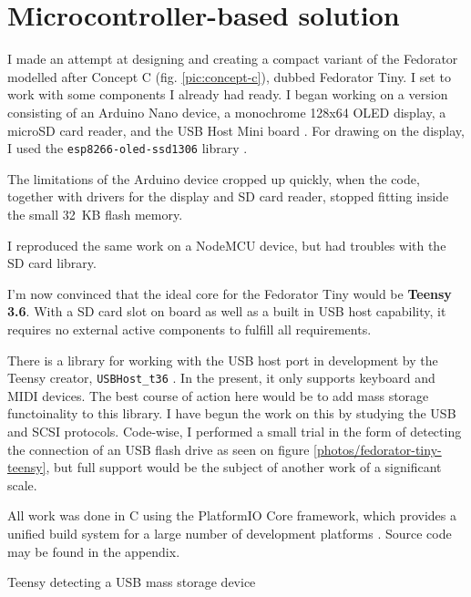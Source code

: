 \chapter{Microcontroller-based solution}
    
    I made an attempt at designing and creating a compact variant of the Fedorator modelled after Concept C  (fig. \ref{pic:concept-c}), dubbed Fedorator Tiny.  I set to work with some components I already had ready.  I began working on a version consisting of an Arduino Nano device, a monochrome 128x64 OLED display, a microSD card reader, and the USB Host Mini board \cite{usb-host-shield}.  For drawing on the display, I used the \texttt{esp8266-oled-ssd1306} library \cite{esp8266-oled-ssd1306}.
    
    The limitations of the Arduino device cropped up quickly, when the code, together with drivers for the display and SD card reader, stopped fitting inside the small 32~KB flash memory.
    
    I reproduced the same work on a NodeMCU device, but had troubles with the SD card library.
    
    I'm now convinced that the ideal core for the Fedorator Tiny would be \textbf{Teensy 3.6}.  With a SD card slot on board as well as a built in USB host capability, it requires no external active components to fulfill all requirements.
    
    There is a library for working with the USB host port in development by the Teensy creator, \texttt{USBHost\_t36} \cite{usbhost_t36}.  In the present, it only supports keyboard and MIDI devices.  The best course of action here would be to add mass storage functoinality to this library.  I have begun the work on this by studying the USB and SCSI protocols.  Code-wise, I performed a small trial in the form of detecting the connection of an USB flash drive as seen on figure \ref{photos/fedorator-tiny-teensy}, but full support would be the subject of another work of a significant scale.
    
    All work was done in C using the PlatformIO Core framework, which provides a unified build system for a large number of development platforms \cite{platformio-core}.  Source code may be found in the appendix.
    
        {Teensy detecting a USB mass storage device}
    
